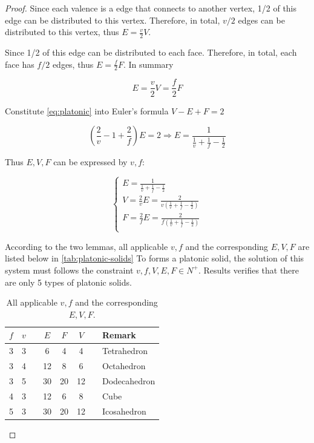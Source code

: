 \begin{proof}
    Since each valence is a edge that connects to another vertex, 1/2 of this edge can be distributed to this vertex. Therefore, in total, $v/2$ edges can be distributed to this vertex, thus $E = \frac{v}{2}V$. 
    
    Since 1/2 of this edge can be distributed to each face. Therefore, in total, each face has $f/2$ edges, thus $E = \frac{f}{2}F$. In summary

    \begin{equation}
        E = \frac{v}{2}V = \frac{f}{2}F
        \label{eq:platonic}
    \end{equation}

    Constitute \autoref{eq:platonic} into Euler's formula $V - E + F = 2$

    \begin{equation}
        (\frac{2}{v} - 1 + \frac{2}{f}) E = 2
        \Rightarrow E = \frac{1}{\frac{1}{v} + \frac{1}{f} - \frac{1}{2}}
    \end{equation}

    Thus $E, V, F$ can be expressed by $v, f$:

    \begin{equation}
        \begin{cases}
            E = \frac{1}{\frac{1}{v} + \frac{1}{f} - \frac{1}{2}}\\
            V = \frac{2}{v} E = \frac{2}{v(\frac{1}{v} + \frac{1}{f} - \frac{1}{2})}\\
            F = \frac{2}{f} E = \frac{2}{f(\frac{1}{v} + \frac{1}{f} - \frac{1}{2})}\\
        \end{cases}
    \end{equation}

    According to the two lemmas, all applicable $v, f$ and the corresponding $E, V, F$ are listed below in \autoref{tab:platonic-solids} To forms a platonic solid, the solution of this system must follows the constraint $v, f, V, E, F \in N^+$. Results verifies that there are only 5 types of platonic solids.

    \begin{table}[H]
        \centering
        \caption{All applicable $v, f$ and the corresponding $E, V, F$.}
        \begin{tabular}{ccccccll}
            \toprule
            $f$ & $v$ && $E$ & $F$ & $V$ && Remark\\
            \midrule 
            3 & 3 && 6 & 4 & 4 && Tetrahedron\\
            3 & 4 && 12 & 8 & 6 && Octahedron\\
            3 & 5 && 30 & 20 & 12 && Dodecahedron\\
            4 & 3 && 12 & 6 & 8 && Cube\\
            5 & 3 && 30 & 20 & 12 && Icosahedron\\
            \bottomrule 
        \end{tabular}
        \label{tab:platonic-solids}
    \end{table}
\end{proof}

